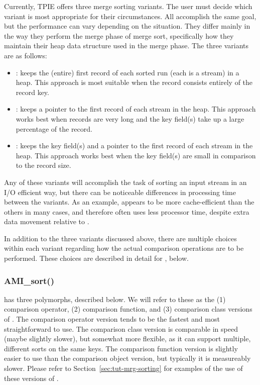 Currently, TPIE offers three merge sorting variants. The
user must decide which variant is most appropriate for their
circumstances.  All accomplish the same goal, but the
performance can vary depending on the situation. They differ
mainly in the way they perform the merge phase of merge
sort, specifically how they maintain their heap data
structure used in the merge phase. The three variants are as
follows:
\begin{itemize}
    \item {}: keeps the (entire) first record
    of each sorted run (each is a stream) in a heap. This
    approach is most suitable when the record consists
    entirely of the record key.
    
    \item {}: keeps a pointer to the
    first record of each stream in the heap. This approach
    works best when records are very long and the key
    field(s) take up a large percentage of the record.

    \item {}: keeps the key field(s) and
    a pointer to the first record of each stream in the
    heap. This approach works best when the key field(s) are
    small in comparison to the record size.
\end{itemize}

Any of these variants will accomplish the task of sorting an
input stream in an I/O efficient way, but there can be
noticeable differences in processing time between the
variants. As an example,  appears to be
more cache-efficient than the others in many cases, and
therefore often uses less processor time, despite extra data
movement relative to .

In addition to the three variants discussed above, there are
multiple choices within each variant regarding how the
actual comparison operations are to be performed. These
choices are described in detail for , below.

\subsubsection{AMI\_sort()}
 has three polymorphs, described below.
We will refer to these as the (1) comparison operator, (2)
comparison function, and (3) comparison class versions of
. The comparison operator version tends to
be the fastest and most straightforward to use. The
comparison class version is comparable in speed (maybe
slightly slower), but somewhat more flexible, as it can support
multiple, different sorts on the same keys. The comparison
function version is slightly easier to use than the
comparison object version, but typically it is measureably slower.
Please refer to Section~\ref{sec:tut-mrg-sorting} for examples
of the use of these versions of .

